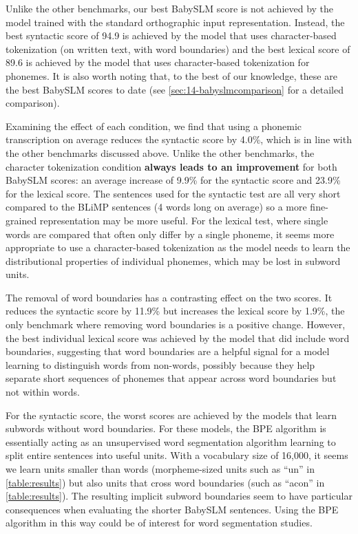 Unlike the other benchmarks, our best BabySLM score is not achieved by the model trained with the standard orthographic input representation. Instead, the best syntactic score of 94.9 is achieved by the model that uses character-based tokenization (on written text, with word boundaries) and the best lexical score of 89.6 is achieved by the model that uses character-based tokenization for phonemes. It is also worth noting that, to the best of our knowledge, these are the best BabySLM scores to date (see \cref{sec:14-babyslmcomparison} for a detailed comparison).

Examining the effect of each condition, we find that using a phonemic transcription on average reduces the syntactic score by 4.0\%, which is in line with the other benchmarks discussed above. Unlike the other benchmarks, the character tokenization condition \textbf{always leads to an improvement} for both BabySLM scores: an average increase of 9.9\% for the syntactic score and 23.9\% for the lexical score. The sentences used for the syntactic test are all very short compared to the BLiMP sentences (4 words long on average) so a more fine-grained representation may be more useful. For the lexical test, where single words are compared that often only differ by a single phoneme, it seems more appropriate to use a character-based tokenization as the model needs to learn the distributional properties of individual phonemes, which may be lost in subword units. 

The removal of word boundaries has a contrasting effect on the two scores. It reduces the syntactic score by 11.9\% but increases the lexical score by 1.9\%, the only benchmark where removing word boundaries is a positive change. However, the best individual lexical score was achieved by the model that did include word boundaries, suggesting that word boundaries are a helpful signal for a model learning to distinguish words from non-words, possibly because they help separate short sequences of phonemes that appear across word boundaries but not within words. 


For the syntactic score, the worst scores are achieved by the models that learn subwords without word boundaries. For these models, the BPE algorithm is essentially acting as an unsupervised word segmentation algorithm learning to split entire sentences into useful units. With a vocabulary size of 16,000, it seems we learn units smaller than words (morpheme-sized units such as ``un'' in \cref{table:results}) but also units that cross word boundaries (such as ``acon'' in \cref{table:results}). The resulting implicit subword boundaries seem to have particular consequences when evaluating the shorter BabySLM sentences. Using the BPE algorithm in this way could be of interest for word segmentation studies. 

